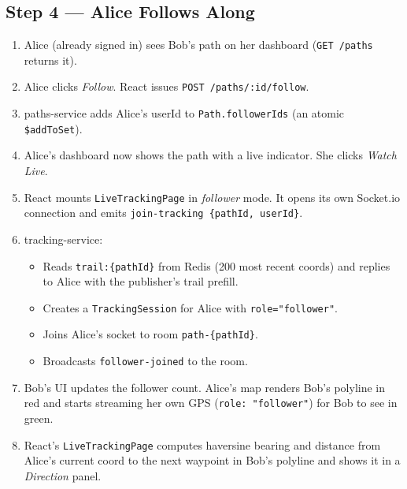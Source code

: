 \documentclass[11pt,a4paper]{article}
\begin{document}
\subsection{Step 4 — Alice Follows Along}
\begin{enumerate}[leftmargin=*]
  \item Alice (already signed in) sees Bob's path on her dashboard
        (\texttt{GET /paths} returns it).
  \item Alice clicks \emph{Follow}.  React issues
        \texttt{POST /paths/:id/follow}.
  \item paths-service adds Alice's userId to
        \texttt{Path.followerIds} (an atomic
        \texttt{\$addToSet}).
  \item Alice's dashboard now shows the path with a live indicator.
        She clicks \emph{Watch Live}.
  \item React mounts \texttt{LiveTrackingPage} in
        \emph{follower} mode.  It opens its own Socket.io
        connection and emits
        \texttt{join-tracking \{pathId, userId\}}.
  \item tracking-service:
        \begin{itemize}[leftmargin=*]
          \item Reads \texttt{trail:\{pathId\}} from Redis (200
                most recent coords) and replies to Alice with the
                publisher's trail prefill.
          \item Creates a \texttt{TrackingSession} for Alice with
                \texttt{role="follower"}.
          \item Joins Alice's socket to room
                \texttt{path-\{pathId\}}.
          \item Broadcasts \texttt{follower-joined} to the room.
        \end{itemize}
  \item Bob's UI updates the follower count.  Alice's map renders
        Bob's polyline in red and starts streaming her own GPS
        (\texttt{role: "follower"}) for Bob to see in green.
  \item React's \texttt{LiveTrackingPage} computes haversine
        bearing and distance from Alice's current coord to the
        next waypoint in Bob's polyline and shows it in a
        \emph{Direction} panel.
\end{enumerate}
\end{document}
